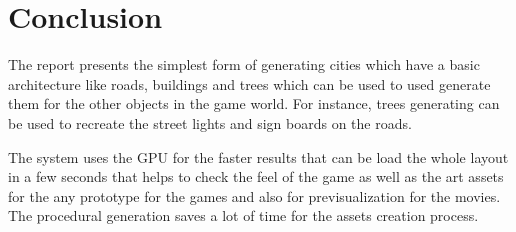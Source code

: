 \chapter{Conclusion}
\Large The report presents the simplest form of generating cities which have a basic architecture like roads, buildings and trees which can be used to used generate them for the other objects in the game world. For instance, trees generating can be used to recreate the street lights and sign boards on the roads.

\vspace{0.5cm}

\Large The system uses the GPU for the faster results that can be load the whole layout in a few seconds that helps to check the feel of the game as well as the art assets for the any prototype for the games and also for previsualization for the movies. The procedural generation saves a lot of time for the assets creation process.